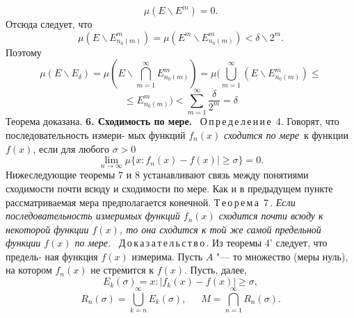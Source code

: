 \documentclass[a5paper]{book}
\begin{document}
\begin{equation*} \mu(E\backslash E^m)=0.\end{equation*}
Отсюда следует, что 
\begin{equation*} \mu(E\backslash E^m_{n_{0}(m)})=\mu(E^m\backslash E^m_{n_{0}(m)})<\delta\backslash 2^m.\end{equation*}
Поэтому \newline 
\begin{equation*} \mu(E\backslash E_{\delta})=\mu(E \backslash \bigcap^\infty_{m=1} E^m_{n_{0}(m)})=\mu(\bigcup^\infty_{m=1}(E\backslash E^m_{n_{0}(m)})\leqslant\end{equation*}
\begin{equation*}\leqslant E^m_{n_{0}(m)})<\sum^\infty_{m=1}\frac{\delta}{2^m}=\delta\end{equation*}
Теорема доказана.\newline
\indent \textbf{6. Сходимость по мере.}\ \newline
\indent О\,п\,р\,е\,д\,е\,л\,е\,н\,и\,е\, 4. Говорят, что последовательность измери- \linebreak 
мых функций $f_{n}(x)$ \textit{сходится по мере}\ к функции $f(x)$, если для \linebreak 
любого $\sigma>0$  
\begin{equation*}\lim \limits_{n \to \infty} \mu \lbrace x:f_{n}(x)-f(x)|\geqslant\sigma\rbrace =0.\end{equation*}
\indent Нижеследующие теоремы 7 и 8 устанавливают связь между \linebreak 
понятиями сходимости почти всюду и сходимости по мере. Как \linebreak 
и в предыдущем пункте рассматриваемая мера предполагается \linebreak 
конечной. \newline 
\indent Т\,е\,о\,р\,е\,м\,а\, 7\,. \textit{Если последовательность измеримых функций \linebreak 
${f_{n}(x)}$ сходится почти всюду к некоторой функции $f(x)$, то она \linebreak 
сходится к той же самой предельной функции $f(x)$ по мере.}\ \linebreak 
\indent Д\,о\,к\,а\,з\,а\,т\,е\,л\,ь\,с\,т\,в\,о\,. Из теоремы 4' следует, что предель- \linebreak 
ная функция $f(x)$ измерима. Пусть $A$ "--- то множество (меры \linebreak 
нуль), на котором $f_{n}(x)$ не стремится к $f(x)$. Пусть, далее,\linebreak
\begin{equation*}E_{k}(\sigma)={x:|f_{k}(x)-f(x)|\geqslant\sigma},\end{equation*}
\begin{equation*}R_{n}(\sigma)=\bigcup^\infty_{k=n}E_{k}(\sigma),\,\,\,\,\,\,\,\,\,M=\bigcap^\infty_{n=1}R_{n}(\sigma).\end{equation*}
\end{document}
